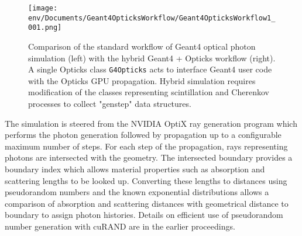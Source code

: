 \documentclass{webofc}
\begin{document}
%
\begin{figure}
\centering
\texttt{[image: env/Documents/Geant4OpticksWorkflow/Geant4OpticksWorkflow1\_001.png]}
\caption{Comparison of the standard workflow of Geant4 optical photon simulation (left) with the hybrid Geant4 + Opticks workflow (right).
A single Opticks class {\tt G4Opticks} acts to interface Geant4 user code with the Opticks GPU propagation. 
Hybrid simulation requires modification of the classes representing scintillation and Cherenkov processes
to collect "genstep" data structures.}
\label{workflow} 
\end{figure}
%

The simulation is steered from the NVIDIA OptiX ray generation program which 
performs the photon generation followed by propagation up to a configurable maximum 
number of steps. For each step of the propagation, rays representing photons are intersected
with the geometry. The intersected boundary provides a boundary index which allows 
material properties such as absorption and scattering lengths to be looked up. 
Converting these lengths to distances using pseudorandom numbers and 
the known exponential distributions allows a comparison of absorption and scattering distances 
with geometrical distance to boundary to assign photon histories. 
Details on efficient use of pseudorandom number generation with cuRAND\cite{curandURL} are in the 
earlier proceedings\cite{chep2016}.
%
%
%
\end{document}
